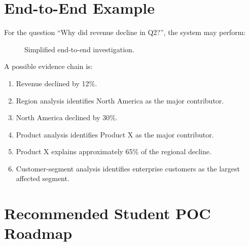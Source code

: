 \documentclass[11pt,a4paper]{article}
\begin{document}
\section{End-to-End Example}

For the question ``Why did revenue decline in Q2?'', the system may perform:

\begin{figure}[H]
\centering
{}
\caption{Simplified end-to-end investigation.}
\label{fig:e2e}
\end{figure}

A possible evidence chain is:

\begin{enumerate}
    \item Revenue declined by 12\%.
    \item Region analysis identifies North America as the major contributor.
    \item North America declined by 30\%.
    \item Product analysis identifies Product X as the major contributor.
    \item Product X explains approximately 65\% of the regional decline.
    \item Customer-segment analysis identifies enterprise customers as the
    largest affected segment.
\end{enumerate}

\section{Recommended Student POC Roadmap}
\end{document}
